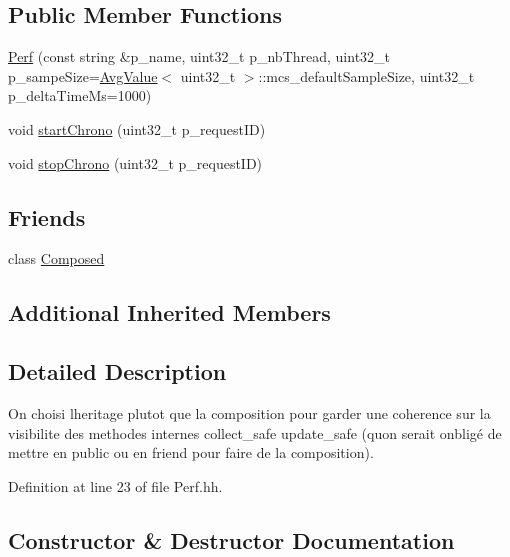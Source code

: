 \subsection*{Public Member Functions}
\begin{DoxyCompactItemize}
\item 
\hyperlink{classxtd_1_1counters_1_1Perf_a765416ba7ef076acdfc8100d2ea5c9a0}{Perf} (const string \&p\+\_\+name, uint32\+\_\+t p\+\_\+nb\+Thread, uint32\+\_\+t p\+\_\+sampe\+Size=\hyperlink{classxtd_1_1counters_1_1AvgValue}{Avg\+Value}$<$ uint32\+\_\+t $>$\+::mcs\+\_\+default\+Sample\+Size, uint32\+\_\+t p\+\_\+delta\+Time\+Ms=1000)
\item 
void \hyperlink{classxtd_1_1counters_1_1Perf_a80692e9b90e8d15a57e2e581591063c0}{start\+Chrono} (uint32\+\_\+t p\+\_\+request\+ID)
\item 
void \hyperlink{classxtd_1_1counters_1_1Perf_a905d73c1604d74e28bb56ea2bb4867ef}{stop\+Chrono} (uint32\+\_\+t p\+\_\+request\+ID)
\end{DoxyCompactItemize}
\subsection*{Friends}
\begin{DoxyCompactItemize}
\item 
class \hyperlink{classxtd_1_1counters_1_1Perf_a93e934ad70d5b32b14beed5572450abf}{Composed}
\end{DoxyCompactItemize}
\subsection*{Additional Inherited Members}


\subsection{Detailed Description}
On choisi l\textquotesingle{}heritage plutot que la composition pour garder une coherence sur la visibilite des methodes internes collect\+\_\+safe update\+\_\+safe (qu\textquotesingle{}on serait onbligé de mettre en public ou en friend pour faire de la composition). 

Definition at line 23 of file Perf.\+hh.



\subsection{Constructor \& Destructor Documentation}
